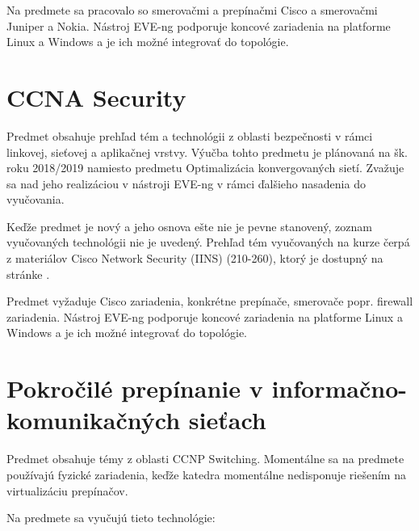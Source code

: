 Na predmete sa pracovalo so smerovačmi a prepínačmi Cisco a smerovačmi Juniper a Nokia. Nástroj EVE-ng podporuje koncové zariadenia na platforme Linux a Windows a je ich možné integrovať do topológie.




\section{CCNA Security}
  
Predmet obsahuje prehľad tém a technológii z oblasti bezpečnosti v rámci linkovej, sieťovej a aplikačnej vrstvy. Výučba tohto predmetu je plánovaná na šk. roku 2018/2019 namiesto predmetu Optimalizácia konvergovaných sietí. Zvažuje sa nad jeho realizáciou v nástroji EVE-ng v rámci ďalšieho nasadenia do vyučovania.

Keďže predmet je nový a jeho osnova ešte nie je pevne stanovený, zoznam vyučovaných technológii nie je uvedený. Prehľad tém vyučovaných na kurze čerpá z materiálov Cisco Network Security (IINS) (210-260), ktorý je dostupný na stránke \cite{ccna_security_topics}.

Predmet vyžaduje Cisco zariadenia, konkrétne prepínače, smerovače popr. firewall zariadenia. Nástroj EVE-ng podporuje koncové zariadenia na platforme Linux a Windows a je ich možné integrovať do topológie.





\section{Pokročilé prepínanie v informačno-komunikačných sieťach}

Predmet obsahuje témy z oblasti CCNP Switching. Momentálne sa na predmete používajú fyzické zariadenia, keďže katedra momentálne nedisponuje riešením na virtualizáciu prepínačov.

Na predmete sa vyučujú tieto technológie:

